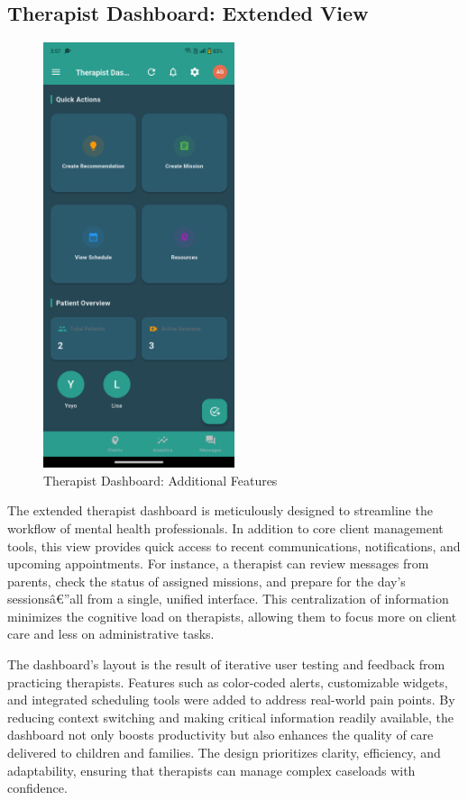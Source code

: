 ﻿\documentclass[12pt,a4paper]{article}
\newcommand{\sectiontitle}[1]{\subsection{#1}}
\begin{document}
\sectiontitle{Therapist Dashboard: Extended View}

\begin{figure}[H]
    \centering
    \includegraphics[width=0.5\textwidth]{Screenshots/restoftherapistdashboard.png}
    \caption{Therapist Dashboard: Additional Features}
    \label{fig:rest-therapist-dashboard}
\end{figure}
The extended therapist dashboard is meticulously designed to streamline the workflow of mental health professionals. In addition to core client management tools, this view provides quick access to recent communications, notifications, and upcoming appointments. For instance, a therapist can review messages from parents, check the status of assigned missions, and prepare for the day's sessionsâ€”all from a single, unified interface. This centralization of information minimizes the cognitive load on therapists, allowing them to focus more on client care and less on administrative tasks.

The dashboard's layout is the result of iterative user testing and feedback from practicing therapists. Features such as color-coded alerts, customizable widgets, and integrated scheduling tools were added to address real-world pain points. By reducing context switching and making critical information readily available, the dashboard not only boosts productivity but also enhances the quality of care delivered to children and families. The design prioritizes clarity, efficiency, and adaptability, ensuring that therapists can manage complex caseloads with confidence.
\end{document}
